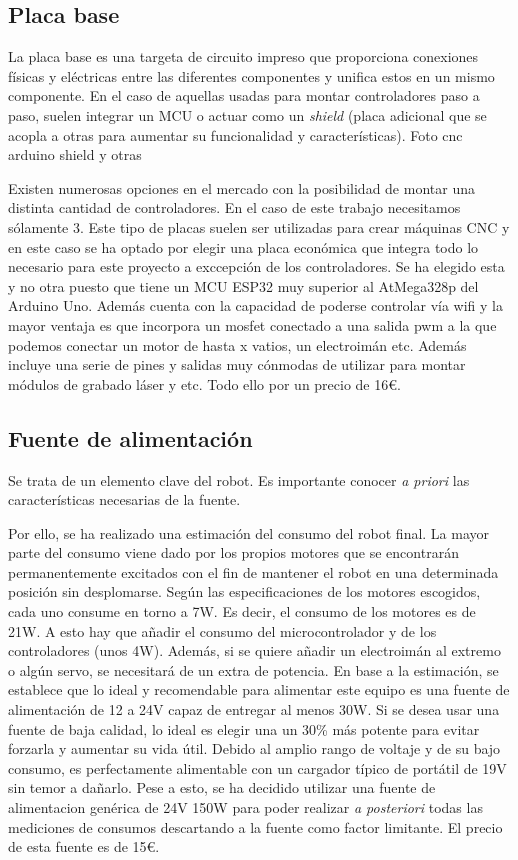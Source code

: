 \subsection{Placa base}
La placa base es una targeta de circuito impreso que proporciona conexiones físicas y eléctricas entre las diferentes componentes y 
unifica estos en un mismo componente. 
En el caso de aquellas usadas para montar controladores paso a paso, suelen integrar un \ac{MCU} o actuar como un \textit{shield} 
(placa adicional que se acopla a otras para aumentar su funcionalidad y características).
Foto cnc arduino shield y otras

Existen numerosas opciones en el mercado con la posibilidad de montar una distinta cantidad de controladores. En el caso de este 
trabajo necesitamos sólamente 3. Este tipo de placas suelen ser utilizadas para crear máquinas CNC y en este caso se ha optado por 
elegir una placa económica que integra todo lo necesario para este proyecto a exccepción de los controladores. 
Se ha elegido esta y no otra puesto que tiene un \acs{MCU} ESP32 muy superior al AtMega328p del Arduino Uno. Además cuenta con la 
capacidad de poderse controlar vía wifi y la mayor ventaja es que incorpora un mosfet conectado a una salida pwm a la que podemos conectar 
un motor de hasta x vatios, un electroimán etc. Además incluye una serie de pines y salidas muy cónmodas de utilizar para montar 
módulos de grabado láser y etc. Todo ello por un precio de 16€.

\subsection{Fuente de alimentación}
Se trata de un elemento clave del robot. Es importante conocer \textit{a priori} las 
características necesarias de la fuente.

Por ello, se ha realizado una estimación del consumo del robot final. La mayor parte del consumo viene dado por los propios motores que 
se encontrarán permanentemente excitados con el fin de mantener el robot en una determinada posición sin desplomarse. Según las especificaciones 
de los motores escogidos, cada uno consume en torno a 7W. Es decir, el consumo de los motores es de 21W. A esto hay que añadir el consumo del 
microcontrolador y de los controladores (unos 4W). Además, si se quiere añadir un electroimán al extremo o algún servo, se necesitará de 
un extra de potencia. 
En base  a la estimación, se establece que lo ideal y recomendable para alimentar este equipo es una fuente de alimentación de 12 a 24V capaz 
de entregar al menos 30W. Si se desea usar una fuente de baja calidad, lo ideal es elegir una un 30\% más potente para evitar forzarla y aumentar 
su vida útil.
Debido al amplio rango de voltaje y de su bajo consumo, es perfectamente alimentable con un cargador típico de portátil de 19V sin temor 
a dañarlo. Pese a esto, se ha decidido utilizar una fuente de alimentacion genérica de 24V 150W para poder realizar \textit{a posteriori} 
todas las mediciones de consumos descartando a la fuente como factor limitante. El precio de esta fuente es de 15\euro.
\newpage
